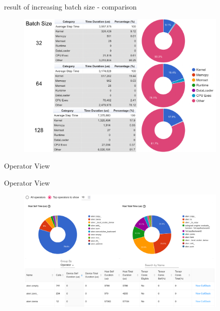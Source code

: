 \documentclass[compress,aspectratio=169]{beamer}
\begin{document}
\begin{frame}{result of increasing batch size - comparison}
    \vspace{-1em}
\begin{center}
    \begin{figure}
        \includegraphics[width=0.9\textwidth]{../../data/scap_gtx1080_profiler-torch_comparison-batch-size}
    \end{figure}
    \end{center}

\end{frame}

\begin{frame}
\begin{center}
Operator View
\end{center}
\end{frame}

\begin{frame}{Operator View}
    \vspace{-1em}
\begin{center}
    \begin{figure}
        \includegraphics[width=0.9\textwidth]{../../data/scap_gtx1080_profiler-torch_batch-size-64_14650758_operator-view}
    \end{figure}
    \end{center}
\end{frame}
\end{document}
